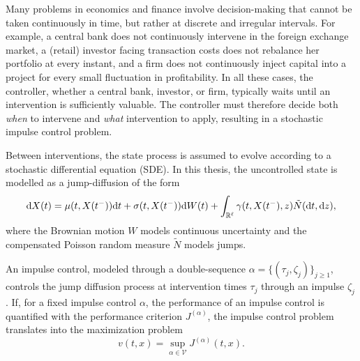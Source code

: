 Many problems in economics and finance involve decision-making that cannot be taken continuously in time, but rather at discrete and irregular intervals. For example, a central bank does not continuously intervene in the foreign exchange market, a (retail) investor facing transaction costs does not rebalance her portfolio at every instant, and a firm does not continuously inject capital into a project for every small fluctuation in profitability. In all these cases, the controller, whether a central bank, investor, or firm, typically waits until an intervention is sufficiently valuable. The controller must therefore decide both \textit{when} to intervene and \textit{what} intervention to apply, resulting in a stochastic impulse control problem.

Between interventions, the state process is assumed to evolve according to a stochastic differential equation (SDE). In this thesis, the uncontrolled state is modelled as a jump-diffusion of the form
\begin{equation*}
    \mathrm{d} X(t) = \mu(t,X(t^-)) \mathrm{d} t + \sigma(t,X(t^-)) \mathrm{d} W(t) + \int_{\mathbb{R}^\ell} \gamma(t,X(t^-),z) \tilde N(\mathrm{d} t, \mathrm{d} z),
\end{equation*}
where the Brownian motion $W$ models continuous uncertainty and the compensated Poisson random measure $\tilde N$ models jumps. 

An impulse control, modeled through a double-sequence $\alpha=\{(\tau_j,\zeta_j)\}_{j \geq 1}$, controls the jump diffusion process at intervention times $\tau_j$ through an impulse $\zeta_j$. If, for a fixed impulse control $\alpha$, the performance of an impulse control is quantified with the performance criterion $J^{(\alpha)}$, the impulse control problem translates into the maximization problem
\begin{equation*}
    v(t,x) = \sup_{\alpha \in \mathcal{V}}J^{(\alpha)}(t,x).
\end{equation*} 

